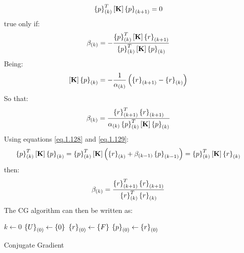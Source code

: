 \begin{equation}
\label{eq.1.129}
\left\lbrace{p}\right \rbrace_{(k)}^T\left[{\mathbf{K}}\right]\left\lbrace{p}\right \rbrace_{(k+1)}=0
\end{equation}
true only if:
\begin{equation}
\beta_{(k)}=-\frac{\left\lbrace{p}\right \rbrace_{(k)}^T\left[{\mathbf{K}}\right]\left\lbrace{r}\right \rbrace_{(k+1)}}{\left\lbrace{p}\right \rbrace_{(k)}^T\left[{\mathbf{K}}\right]\left\lbrace{p}\right \rbrace_{(k)}}
\end{equation}
Being:
\begin{equation}
\left[{\mathbf{K}}\right]\left\lbrace{p}\right \rbrace_{(k)}=-\frac{1}{\alpha_{(k)}}\left(\left\lbrace{r}\right \rbrace_{(k+1)}-\left\lbrace{r}\right \rbrace_{(k)}\right)
\end{equation}
So that:
\begin{equation}
\beta_{(k)}=\frac{\left\lbrace{r}\right \rbrace_{(k+1)}^T\left\lbrace{r}\right \rbrace_{(k+1)}}{\alpha_{(k)}\left\lbrace{p}\right \rbrace_{(k)}^T\left[{\mathbf{K}}\right]\left\lbrace{p}\right \rbrace_{(k)}}
\end{equation}
Using equations \eqref{eq.1.128} and \eqref{eq.1.129}:
\begin{equation}
\left\lbrace{p}\right \rbrace_{(k)}^T\left[{\mathbf{K}}\right]\left\lbrace{p}\right \rbrace_{(k)}=\left\lbrace{p}\right \rbrace_{(k)}^T\left[{\mathbf{K}}\right]\left(\left\lbrace{r}\right \rbrace_{(k)} +\beta_{(k-1)}\left\lbrace{p}\right \rbrace_{(k-1)}\right)=\left\lbrace{p}\right \rbrace_{(k)}^T\left[{\mathbf{K}}\right]\left\lbrace{r}\right \rbrace_{(k)}
\end{equation}
then:
\begin{equation}
\beta_{(k)}=\frac{\left\lbrace{r}\right \rbrace_{(k+1)}^T\left\lbrace{r}\right \rbrace_{(k+1)}}{\left\lbrace{r}\right \rbrace_{(k)}^T\left\lbrace{r}\right \rbrace_{(k)}}
\end{equation}
The CG algorithm can then be written as:
\begin{algorithm}

$k\gets 0$\;
$\left\lbrace{U}\right \rbrace_{(0)}\gets\left\lbrace{0}\right \rbrace$\;
$\left\lbrace{r}\right \rbrace_{(0)}\gets \left\lbrace{F}\right \rbrace$\;
$\left\lbrace{p}\right \rbrace_{(0)}\gets \left\lbrace{r}\right \rbrace_{(0)}$\;
 \caption{Conjugate Gradient \label{CG}}
\end{algorithm}
